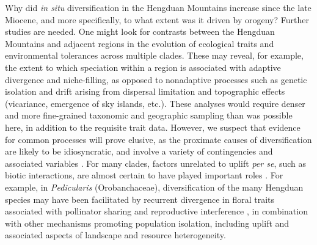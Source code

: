 Why did \textit{in situ} diversification in the Hengduan Mountains
increase since the late Miocene, and more specifically, to what extent
was it driven by orogeny? Further studies are needed. One might look
for contrasts between the Hengduan Mountains and adjacent regions in
the evolution of ecological traits and environmental tolerances
\citep[e.g.,][]{liu2016} across multiple clades. These may reveal, for
example, the extent to which speciation within a region is associated
with adaptive divergence and niche-filling, as opposed to nonadaptive
processes such as genetic isolation and drift arising from dispersal
limitation and topographic effects (vicariance, emergence of sky
islands, etc.). These analyses would require denser and more
fine-grained taxonomic and geographic sampling than was possible here,
in addition to the requisite trait data. However, we suspect that
evidence for common processes will prove elusive, as the proximate
causes of diversification are likely to be idiosyncratic, and involve
a variety of contingencies and associated variables
\citep[e.g.,][]{donoghue2015,bouchenak2015}. For many clades, factors
unrelated to uplift \emph{per se}, such as biotic interactions, are
almost certain to have played important roles
\citep{Luebert2014,Wen2014,Renner2016}. For example, in
\emph{Pedicularis} (Orobanchaceae), diversification of the many
Hengduan species may have been facilitated by recurrent divergence in
floral traits associated with pollinator sharing and reproductive
interference \citep[e.g.,][]{eaton2012}, in combination with other
mechanisms promoting population isolation, including uplift and
associated aspects of landscape and resource heterogeneity.


